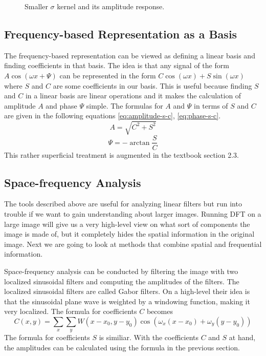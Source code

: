 \documentclass[]{article}
\begin{document}
\begin{figure}
\begin{subfigure}[t]{0.49\textwidth}
    \end{subfigure}
    \caption{Smaller $\sigma$ kernel and its amplitude response.}
\end{figure}

\subsection{Frequency-based Representation as a Basis}
\label{frequency-based-representation-as-a-basis}
The frequency-based representation can be viewed as defining a linear basis and
finding coefficients in that basis. The idea is that any signal of the form $A
\cos(\omega x + \Psi)$ can be represented in the form $C\cos(\omega x) +
S\sin(\omega x)$ where $S$ and $C$ are some coefficients in our basis. This is
useful because finding $S$ and $C$ in a linear basis are linear operations and it
makes the calculation of amplitude $A$ and phase $\Psi$ simple. The formulas for
$A$ and $\Psi$ in terms of $S$ and $C$ are given in the following equations
\ref{eq:amplitude-s-c}, \ref{eq:phase-s-c}.
\begin{equation}
  \label{eq:amplitude-s-c}
  A = \sqrt{C^{2}+S^{2}}
\end{equation}
\begin{equation}
  \label{eq:phase-s-c}
  \Psi = -\arctan{\frac{S}{C}}
\end{equation}
This rather superficial treatment is augmented in the textbook section 2.3.

\subsection{Space-frequency Analysis}
\label{space-frequency-analysis}
The tools described above are useful for analyzing linear filters but run into
trouble if we want to gain understanding about larger images. Running DFT on a
large image will give us a very high-level view on what sort of components the
image is made of, but it completely hides the spatial information in the
original image. Next we are going to look at methods that combine spatial and
frequential information.

Space-frequency analysis can be conducted by filtering the image with two
localized sinusoidal filters and computing the amplitudes of the filters. The
localized sinusoidal filters are called Gabor filters. On a high-level their
idea is that the sinusoidal plane wave is weighted by a windowing function,
making it very localized. The formula for coefficients $C$ becomes
\begin{equation}
  C(x,y) = \sum_{x}{\sum_{y}{W(x-x_{0}, y-y_{0}) \cos(\omega_{x} (x - x_{0}) + \omega_{y} (y - y_{0})) }}
\end{equation}
The formula for coefficients $S$ is similiar. With the coefficients $C$ and $S$
at hand, the amplitudes can be calculated using the formula in the previous
section.
\end{document}
